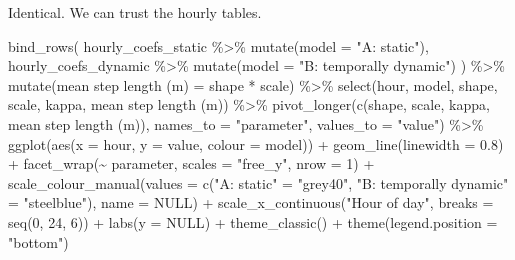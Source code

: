 \documentclass[
  letterpaper,
  DIV=11,
  numbers=noendperiod]{scrartcl}
\newenvironment{Shaded}{\begin{snugshade}}{\end{snugshade}}
\newcommand{\AttributeTok}[1]{\textcolor[rgb]{0.40,0.45,0.13}{#1}}
\newcommand{\ConstantTok}[1]{\textcolor[rgb]{0.56,0.35,0.01}{#1}}
\newcommand{\DecValTok}[1]{\textcolor[rgb]{0.68,0.00,0.00}{#1}}
\newcommand{\FloatTok}[1]{\textcolor[rgb]{0.68,0.00,0.00}{#1}}
\newcommand{\FunctionTok}[1]{\textcolor[rgb]{0.28,0.35,0.67}{#1}}
\newcommand{\NormalTok}[1]{\textcolor[rgb]{0.00,0.23,0.31}{#1}}
\newcommand{\OtherTok}[1]{\textcolor[rgb]{0.00,0.23,0.31}{#1}}
\newcommand{\SpecialCharTok}[1]{\textcolor[rgb]{0.37,0.37,0.37}{#1}}
\newcommand{\StringTok}[1]{\textcolor[rgb]{0.13,0.47,0.30}{#1}}
\begin{document}
Identical. We can trust the hourly tables.

\begin{Shaded}
\begin{Highlighting}[]
\FunctionTok{bind\_rows}\NormalTok{(}
\NormalTok{  hourly\_coefs\_static  }\SpecialCharTok{\%\textgreater{}\%} \FunctionTok{mutate}\NormalTok{(}\AttributeTok{model =} \StringTok{"A: static"}\NormalTok{),}
\NormalTok{  hourly\_coefs\_dynamic }\SpecialCharTok{\%\textgreater{}\%} \FunctionTok{mutate}\NormalTok{(}\AttributeTok{model =} \StringTok{"B: temporally dynamic"}\NormalTok{)}
\NormalTok{) }\SpecialCharTok{\%\textgreater{}\%}
  \FunctionTok{mutate}\NormalTok{(}\StringTok{\textasciigrave{}}\AttributeTok{mean step length (m)}\StringTok{\textasciigrave{}} \OtherTok{=}\NormalTok{ shape }\SpecialCharTok{*}\NormalTok{ scale) }\SpecialCharTok{\%\textgreater{}\%}
  \FunctionTok{select}\NormalTok{(hour, model, shape, scale, kappa, }\StringTok{\textasciigrave{}}\AttributeTok{mean step length (m)}\StringTok{\textasciigrave{}}\NormalTok{) }\SpecialCharTok{\%\textgreater{}\%}
  \FunctionTok{pivot\_longer}\NormalTok{(}\FunctionTok{c}\NormalTok{(shape, scale, kappa, }\StringTok{\textasciigrave{}}\AttributeTok{mean step length (m)}\StringTok{\textasciigrave{}}\NormalTok{),}
               \AttributeTok{names\_to =} \StringTok{"parameter"}\NormalTok{, }\AttributeTok{values\_to =} \StringTok{"value"}\NormalTok{) }\SpecialCharTok{\%\textgreater{}\%}
  \FunctionTok{ggplot}\NormalTok{(}\FunctionTok{aes}\NormalTok{(}\AttributeTok{x =}\NormalTok{ hour, }\AttributeTok{y =}\NormalTok{ value, }\AttributeTok{colour =}\NormalTok{ model)) }\SpecialCharTok{+}
  \FunctionTok{geom\_line}\NormalTok{(}\AttributeTok{linewidth =} \FloatTok{0.8}\NormalTok{) }\SpecialCharTok{+}
  \FunctionTok{facet\_wrap}\NormalTok{(}\SpecialCharTok{\textasciitilde{}}\NormalTok{ parameter, }\AttributeTok{scales =} \StringTok{"free\_y"}\NormalTok{, }\AttributeTok{nrow =} \DecValTok{1}\NormalTok{) }\SpecialCharTok{+}
  \FunctionTok{scale\_colour\_manual}\NormalTok{(}\AttributeTok{values =} \FunctionTok{c}\NormalTok{(}\StringTok{"A: static"} \OtherTok{=} \StringTok{"grey40"}\NormalTok{,}
                                 \StringTok{"B: temporally dynamic"} \OtherTok{=} \StringTok{"steelblue"}\NormalTok{), }\AttributeTok{name =} \ConstantTok{NULL}\NormalTok{) }\SpecialCharTok{+}
  \FunctionTok{scale\_x\_continuous}\NormalTok{(}\StringTok{"Hour of day"}\NormalTok{, }\AttributeTok{breaks =} \FunctionTok{seq}\NormalTok{(}\DecValTok{0}\NormalTok{, }\DecValTok{24}\NormalTok{, }\DecValTok{6}\NormalTok{)) }\SpecialCharTok{+}
  \FunctionTok{labs}\NormalTok{(}\AttributeTok{y =} \ConstantTok{NULL}\NormalTok{) }\SpecialCharTok{+}
  \FunctionTok{theme\_classic}\NormalTok{() }\SpecialCharTok{+}
  \FunctionTok{theme}\NormalTok{(}\AttributeTok{legend.position =} \StringTok{"bottom"}\NormalTok{)}
\end{Highlighting}
\end{Shaded}
\end{document}
